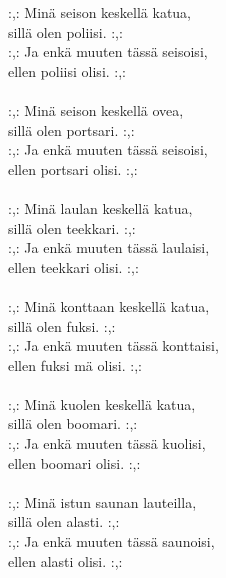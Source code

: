 
            :,: Minä seison keskellä katua, \\
            sillä olen poliisi. :,: \\
            :,: Ja enkä muuten tässä seisoisi, \\
            ellen poliisi olisi. :,: \\
\hspace{10mm} \\
            :,: Minä seison keskellä ovea, \\
            sillä olen portsari. :,: \\
            :,: Ja enkä muuten tässä seisoisi, \\
            ellen portsari olisi. :,: \\
\hspace{10mm} \\
            :,: Minä laulan keskellä katua, \\
            sillä olen teekkari. :,: \\
            :,: Ja enkä muuten tässä laulaisi, \\
            ellen teekkari olisi. :,: \\
\hspace{10mm} \\
            :,: Minä konttaan keskellä katua, \\
            sillä olen fuksi. :,: \\
            :,: Ja enkä muuten tässä konttaisi, \\
            ellen fuksi mä olisi. :,: \\
\hspace{10mm} \\
            :,: Minä kuolen keskellä katua, \\
            sillä olen boomari. :,: \\
            :,: Ja enkä muuten tässä kuolisi, \\
            ellen boomari olisi. :,: \\
\hspace{10mm} \\
            :,: Minä istun saunan lauteilla, \\
            sillä olen alasti. :,: \\
            :,: Ja enkä muuten tässä saunoisi, \\
            ellen alasti olisi. :,: \\
